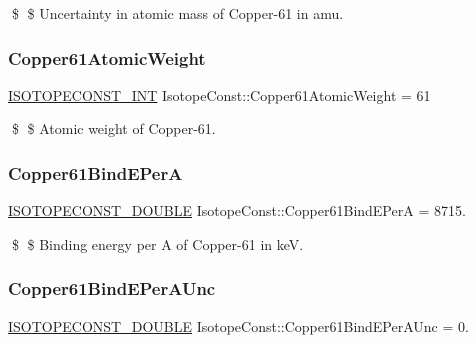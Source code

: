 \$ \$ Uncertainty in atomic mass of Copper-\/61 in amu. \mbox{\label{group___isotope_const-_copper-_cu61_gafd09875d2e52fd2dd07048b10754dda0}} 
\subsubsection{\texorpdfstring{Copper61\+Atomic\+Weight}{Copper61AtomicWeight}}
{\footnotesize\ttfamily \mbox{\hyperlink{group___isotope_const-_macros_ga5f18360b3e99483a35c32d789e62621c}{I\+S\+O\+T\+O\+P\+E\+C\+O\+N\+S\+T\+\_\+\+I\+NT}} Isotope\+Const\+::\+Copper61\+Atomic\+Weight = 61}

\$ \$ Atomic weight of Copper-\/61. \mbox{\label{group___isotope_const-_copper-_cu61_gafb66a465972d050fe8598ac5ed3c59f0}} 
\subsubsection{\texorpdfstring{Copper61\+Bind\+E\+PerA}{Copper61BindEPerA}}
{\footnotesize\ttfamily \mbox{\hyperlink{group___isotope_const-_macros_ga8f45a7272ce02c0b4c65c44636ed719a}{I\+S\+O\+T\+O\+P\+E\+C\+O\+N\+S\+T\+\_\+\+D\+O\+U\+B\+LE}} Isotope\+Const\+::\+Copper61\+Bind\+E\+PerA = 8715.}

\$ \$ Binding energy per A of Copper-\/61 in keV. \mbox{\label{group___isotope_const-_copper-_cu61_ga9f670dd8b203e481814ca003279fcde7}} 
\subsubsection{\texorpdfstring{Copper61\+Bind\+E\+Per\+A\+Unc}{Copper61BindEPerAUnc}}
{\footnotesize\ttfamily \mbox{\hyperlink{group___isotope_const-_macros_ga8f45a7272ce02c0b4c65c44636ed719a}{I\+S\+O\+T\+O\+P\+E\+C\+O\+N\+S\+T\+\_\+\+D\+O\+U\+B\+LE}} Isotope\+Const\+::\+Copper61\+Bind\+E\+Per\+A\+Unc = 0.}

